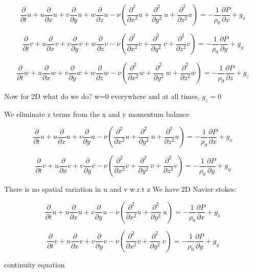 \documentclass[11pt]{article}
\begin{document}
$$\frac{\partial }{\partial t} u + u \frac{\partial}{\partial x} u + v \frac{\partial}{\partial y} u + w \frac{\partial}{\partial z} u - \nu ( \frac{\partial^2}{\partial x^2} u + \frac{\partial^2}{\partial y^2} \ u + \frac{\partial^2}{\partial z^2} u) = - \frac{1}{\rho_0} \frac{\partial P}{\partial x} +g_x$$

$$\frac{\partial }{\partial t} v + u \frac{\partial}{\partial x} v + v \frac{\partial}{\partial y} v + w \frac{\partial}{\partial z} v - \nu ( \frac{\partial^2}{\partial x^2} v + \frac{\partial^2}{\partial y^2} \ v + \frac{\partial^2}{\partial z^2} v) = - \frac{1}{\rho_0} \frac{\partial P}{\partial y} +g_y$$

$$\frac{\partial }{\partial t} w + u \frac{\partial}{\partial x} w + v \frac{\partial}{\partial y} w + w \frac{\partial}{\partial z} w - \nu ( \frac{\partial^2}{\partial x^2} w + \frac{\partial^2}{\partial y^2} \ w + \frac{\partial^2}{\partial z^2} w) = - \frac{1}{\rho_0} \frac{\partial P}{\partial z} +g_z$$

Now for 2D what do we do?
w=0 everywhere and at all times, $g_z=0$

We eliminate z terms from the x and y momentum balance

$$\frac{\partial }{\partial t} u + u \frac{\partial}{\partial x} u + v \frac{\partial}{\partial y} u - \nu ( \frac{\partial^2}{\partial x^2} u + \frac{\partial^2}{\partial y^2} \ u + \frac{\partial^2}{\partial z^2} u) = - \frac{1}{\rho_0} \frac{\partial P}{\partial x} +g_x$$

$$\frac{\partial }{\partial t} v + u \frac{\partial}{\partial x} v + v \frac{\partial}{\partial y} v - \nu ( \frac{\partial^2}{\partial x^2} v + \frac{\partial^2}{\partial y^2} \ v + \frac{\partial^2}{\partial z^2} v) = - \frac{1}{\rho_0} \frac{\partial P}{\partial y} +g_y$$

There is no spatial variation in u and v w.r.t z
We have 2D Navier stokes:

$$\frac{\partial }{\partial t} u + u \frac{\partial}{\partial x} u + v \frac{\partial}{\partial y} u - \nu ( \frac{\partial^2}{\partial x^2} u + \frac{\partial^2}{\partial y^2} \ u ) = - \frac{1}{\rho_0} \frac{\partial P}{\partial x} +g_x$$

$$\frac{\partial }{\partial t} v + u \frac{\partial}{\partial x} v + v \frac{\partial}{\partial y} v - \nu ( \frac{\partial^2}{\partial x^2} v + \frac{\partial^2}{\partial y^2} \ v ) = - \frac{1}{\rho_0} \frac{\partial P}{\partial y} +g_y$$

continuity equation
\end{document}

